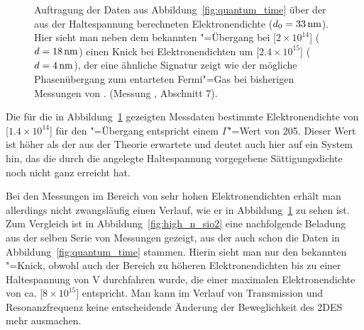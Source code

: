 \begin{figure}[h!tbp]
    \hfill%
    \begin{minipage}[b]{\textwidth-\midwidth-\tabcolsep}
        \caption[Hohe Elektronendichten auf \SiO, Dichteverlauf]{Auftragung der Daten aus Abbildung~\ref{fig:quantum_time} über der aus der Haltespannung berechneten Elektronendichte ($d_0=\unit[33]{nm}$). Hier sieht man neben dem bekannten "=Übergang bei \unit[$2\times10^{14}$]{\Em} ($d=\unit[18]{nm}$) einen Knick bei Elektronendichten um \unit[$2.4\times10^{15}$]{\Em} ($d=\unit[4]{nm}$), der eine ähnliche Signatur zeigt wie der mögliche Phasenübergang zum entarteten Fermi"=Gas bei bisherigen Messungen von  \cite{guenzler,Gue96}. (Messung , Abschnitt 7).}
        \label{fig:quantum_melting}
    \end{minipage}
\end{figure}

Die für die in Abbildung~\ref{fig:quantum_melting} gezeigten Messdaten bestimmte Elektronendichte von \unit[$1.4\times10^{14}$]{\Em} für den "=Übergang entspricht einem $\Gamma$"=Wert von 205. Dieser Wert ist höher als der aus der Theorie erwartete und deutet auch hier auf ein System hin, das die durch die angelegte Haltespannung vorgegebene Sättigungsdichte noch nicht ganz erreicht hat.

Bei den Messungen im Bereich von sehr hohen Elektronendichten erhält man allerdings nicht zwangsläufig einen Verlauf, wie er in Abbildung~\ref{fig:quantum_melting} zu sehen ist. Zum Vergleich ist in Abbildung~\ref{fig:high_n_sio2} eine nachfolgende Beladung aus der selben Serie von Messungen gezeigt, aus der auch schon die Daten in Abbildung~\ref{fig:quantum_time} stammen. Hierin sieht man nur den bekannten "=Knick, obwohl auch der Bereich zu höheren Elektronendichten bis zu einer Haltespannung von \unit[7]{V} durchfahren wurde, die einer maximalen Elektronendichte von ca. \unit[$8\times10^{15}$]{\Em} entspricht. Man kann im Verlauf von Transmission und Resonanzfrequenz keine entscheidende Änderung der Beweglichkeit des 2DES mehr ausmachen.

